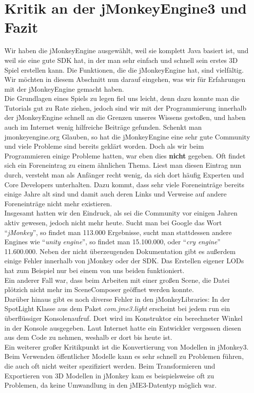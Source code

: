 \section{Kritik an der jMonkeyEngine3 und Fazit}
Wir haben die jMonkeyEngine ausgewählt, weil sie komplett Java basiert ist, und weil sie eine gute SDK hat, in der man sehr einfach und schnell sein erstes 3D Spiel erstellen kann. Die Funktionen, die die jMonkeyEngine hat, sind vielfältig. Wir möchten in diesem Abschnitt nun darauf eingehen, was wir für Erfahrungen mit der jMonkeyEngine gemacht haben. \\
Die Grundlagen eines Spiels zu legen fiel uns leicht, denn dazu konnte man die Tutorials gut zu Rate ziehen, jedoch sind wir mit der Programmierung innerhalb der jMonkeyEngine schnell an die Grenzen unseres Wissens gestoßen, und haben auch im Internet wenig hilfreiche Beiträge gefunden. Schenkt man jmonkeyengine.org Glauben, so hat die jMonkeyEngine eine sehr gute Community und viele Probleme sind bereits geklärt worden. Doch als wir beim Programmieren einige Probleme hatten, war eben dies \textbf{nicht} gegeben. Oft findet sich ein Foreneintrag zu einem ähnlichen Thema. Liest man diesen Eintrag nun durch, versteht man als Anfänger recht wenig, da sich dort häufig Experten und Core Developers unterhalten. Dazu kommt, dass sehr viele Foreneinträge bereits einige Jahre alt sind und damit auch deren Links und Verweise auf andere Foreneinträge nicht mehr existieren. \\
Insgesamt hatten wir den Eindruck, als sei die Community vor einigen Jahren aktiv gewesen, jedoch nicht mehr heute. Sucht man bei Google das Wort \enquote{\emph{jMonkey}}, so findet man 113.000 Ergebnisse, sucht man stattdessen andere Engines wie \enquote{\emph{unity engine}}, so findet man 15.100.000, oder \enquote{\emph{cry engine}} 11.600.000. Neben der nicht überzeugenden Dokumentation gibt es außerdem einige Fehler innerhalb von jMonkey oder der SDK. Das Erstellen eigener LODs hat zum Beispiel nur bei einem von uns beiden funktioniert. \\
Ein anderer Fall war, dass beim Arbeiten mit einer großen Scene, die Datei plötzich nicht mehr im SceneComposer geöffnet werden konnte. \\
Darüber hinaus gibt es noch diverse Fehler in den jMonkeyLibraries: In der SpotLight Klasse aus dem Paket \emph{com.jme3.light} erscheint bei jedem run ein überflüssiger Konsolenaufruf. Dort wird im Konstruktor ein berechneter Winkel in der Konsole ausgegeben. Laut Internet hatte ein Entwickler vergessen diesen aus dem Code zu nehmen, weshalb er dort bis heute ist. \\
Ein weiterer großer Kritikpunkt ist die Konvertierung von Modellen in jMonkey3.
Beim Verwenden öffentlicher Modelle kann es sehr schnell zu Problemen führen, die auch oft nicht weiter spezifiziert werden. Beim Transformieren und Exportieren von 3D Modellen in jMonkey kam es beispielsweise oft zu Problemen, da keine Umwandlung in den jME3-Datentyp möglich war. 

